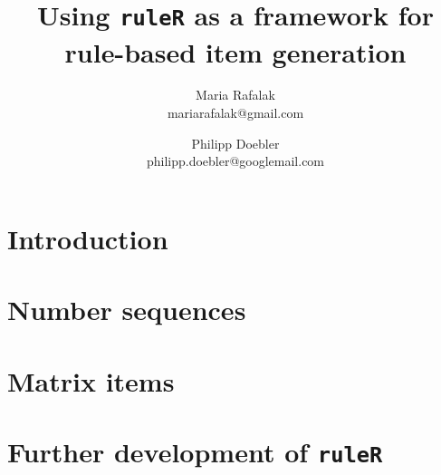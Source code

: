 \documentclass[a4paper]{article}
\title{Using \texttt{ruleR} as a framework for rule-based item generation}
\author{
Maria Rafalak\\
mariarafalak@gmail.com
\and
Philipp Doebler \\
      philipp.doebler@googlemail.com}
\begin{document}

\maketitle

\section{Introduction}

\section{Number sequences}

\section{Matrix items}

\section{Further development of \texttt{ruleR}}

{}

\end{document}
